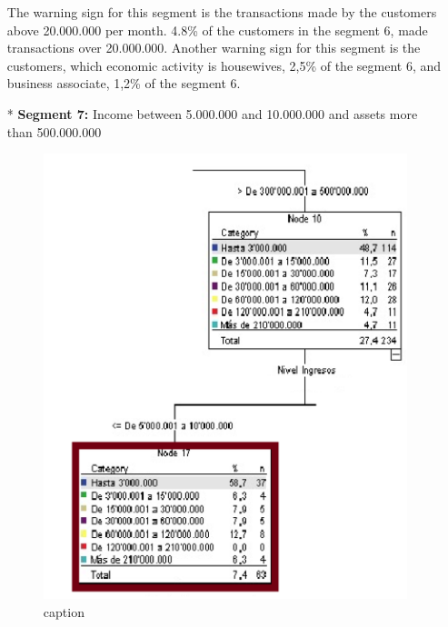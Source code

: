 \begin{itemize}
\begin{figure}[ht!]
\end{figure}
The warning sign for this segment is the transactions made by the customers above 20.000.000 per month.  4.8\% of the customers in the segment 6, made transactions over 20.000.000.
Another warning sign for this segment is the customers, which economic activity is housewives, 2,5\% of the segment 6, and business associate, 1,2\% of the segment 6.
\item[*] \textbf{Segment 7:}
Income between 5.000.000 and 10.000.000 and assets more than 500.000.000
\begin{figure}[ht!]
  \centering
  \includegraphics[scale=0.65]{Segmento7}
  \caption{caption}


\end{figure}
\end{itemize}
